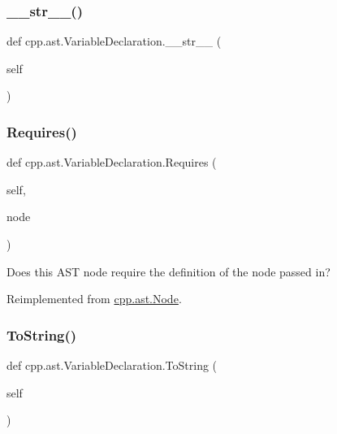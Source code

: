 \subsubsection{\texorpdfstring{\_\_str\_\_()}{\_\_str\_\_()}}
{\footnotesize\ttfamily def cpp.\+ast.\+Variable\+Declaration.\+\_\+\+\_\+str\+\_\+\+\_\+ (\begin{DoxyParamCaption}\item[{}]{self }\end{DoxyParamCaption})}

\mbox{\label{classcpp_1_1ast_1_1_variable_declaration_aaa1cae7cf191e6d561d861cd053a0bf4}} 
\subsubsection{\texorpdfstring{Requires()}{Requires()}}
{\footnotesize\ttfamily def cpp.\+ast.\+Variable\+Declaration.\+Requires (\begin{DoxyParamCaption}\item[{}]{self,  }\item[{}]{node }\end{DoxyParamCaption})}

\begin{DoxyVerb}Does this AST node require the definition of the node passed in?\end{DoxyVerb}
 

Reimplemented from \mbox{\hyperlink{classcpp_1_1ast_1_1_node_a31ae211f954a8c578ef16226df5ac8c8}{cpp.\+ast.\+Node}}.

\mbox{\label{classcpp_1_1ast_1_1_variable_declaration_a047aa4afddf7b7823a4095cea9477a21}} 
\subsubsection{\texorpdfstring{ToString()}{ToString()}}
{\footnotesize\ttfamily def cpp.\+ast.\+Variable\+Declaration.\+To\+String (\begin{DoxyParamCaption}\item[{}]{self }\end{DoxyParamCaption})}

